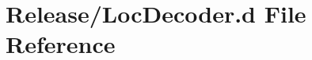 \hypertarget{Release_2LocDecoder_8d}{}\section{Release/\+Loc\+Decoder.d File Reference}
\label{Release_2LocDecoder_8d}
